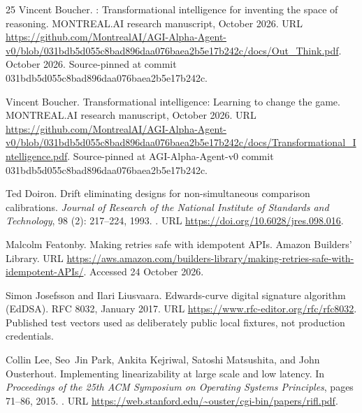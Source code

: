 \documentclass[11pt]{article}
\begin{document}
\begin{thebibliography}{25}
Vincent Boucher.
: Transformational intelligence for inventing the space of
  reasoning.
\newblock MONTREAL.AI research manuscript, October 2026{}.
\newblock URL
  \url{https://github.com/MontrealAI/AGI-Alpha-Agent-v0/blob/031bdb5d055c8bad896daa076baea2b5e17b242c/docs/Out_Think.pdf}.
 October 2026. Source-pinned at commit
  031bdb5d055c8bad896daa076baea2b5e17b242c.

Vincent Boucher.
\newblock Transformational intelligence: Learning to change the game.
\newblock MONTREAL.AI research manuscript, October 2026{}.
\newblock URL
  \url{https://github.com/MontrealAI/AGI-Alpha-Agent-v0/blob/031bdb5d055c8bad896daa076baea2b5e17b242c/docs/Transformational_Intelligence.pdf}.
\newblock Source-pinned at AGI-Alpha-Agent-v0 commit
  031bdb5d055c8bad896daa076baea2b5e17b242c.

Ted Doiron.
\newblock Drift eliminating designs for non-simultaneous comparison
  calibrations.
\newblock \emph{Journal of Research of the National Institute of Standards and
  Technology}, 98 (2): 217--224, 1993.
\newblock {}.
\newblock URL \url{https://doi.org/10.6028/jres.098.016}.

Malcolm Featonby.
\newblock Making retries safe with idempotent {APIs}.
\newblock Amazon Builders' Library.
\newblock URL
  \url{https://aws.amazon.com/builders-library/making-retries-safe-with-idempotent-APIs/}.
\newblock Accessed 24 October 2026.

Simon Josefsson and Ilari Liusvaara.
\newblock Edwards-curve digital signature algorithm ({EdDSA}).
\newblock RFC 8032, January 2017.
\newblock URL \url{https://www.rfc-editor.org/rfc/rfc8032}.
\newblock Published test vectors used as deliberately public local fixtures,
  not production credentials.

Collin Lee, Seo~Jin Park, Ankita Kejriwal, Satoshi Matsushita, and John
  Ousterhout.
\newblock Implementing linearizability at large scale and low latency.
\newblock In \emph{Proceedings of the 25th ACM Symposium on Operating Systems
  Principles}, pages 71--86, 2015.
\newblock {}.
\newblock URL \url{https://web.stanford.edu/~ouster/cgi-bin/papers/rifl.pdf}.


\end{thebibliography}
\end{document}
